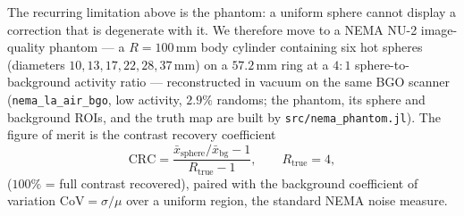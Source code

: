 \documentclass[11pt]{article}
\newcommand{\code}[1]{\texttt{#1}}
\begin{document}
The recurring limitation above is the phantom: a uniform sphere cannot display a
correction that is degenerate with it. We therefore move to a NEMA NU-2
image-quality phantom --- a $R=100$\,mm body cylinder containing six hot spheres
(diameters $10,13,17,22,28,37$\,mm) on a $57.2$\,mm ring at a $4{:}1$
sphere-to-background activity ratio --- reconstructed in vacuum on the same BGO
scanner (\code{nema\_la\_air\_bgo}, low activity, $2.9\%$ randoms; the phantom,
its sphere and background ROIs, and the truth map are built by
\code{src/nema\_phantom.jl}). The figure of merit is the contrast recovery
coefficient
\begin{equation}
  \text{CRC} = \frac{\bar x_{\text{sphere}}/\bar x_{\text{bg}} - 1}{R_{\text{true}} - 1},
  \qquad R_{\text{true}} = 4,
  \label{eq:crc}
\end{equation}
($100\%$ = full contrast recovered), paired with the background coefficient of
variation $\text{CoV}=\sigma/\mu$ over a uniform region, the standard NEMA
noise measure.
\end{document}
